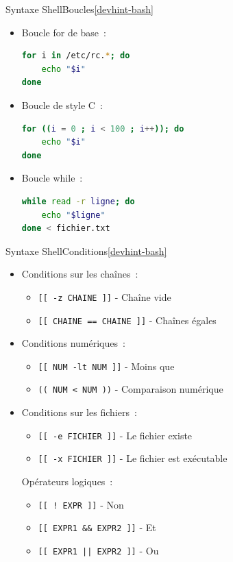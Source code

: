 \documentclass{beamer}
\begin{document}
    \begin{frame}[fragile]{Syntaxe Shell}{Boucles\cref{devhint-bash}}
        \begin{itemize}
            \item Boucle for de base~:
            \begin{lstlisting}[language=bash]
for i in /etc/rc.*; do
    echo "$i"
done
            \end{lstlisting}
            \item Boucle de style C~:
            \begin{lstlisting}[language=bash]
for ((i = 0 ; i < 100 ; i++)); do
    echo "$i"
done
            \end{lstlisting}
            \item Boucle while~:
            \begin{lstlisting}[language=bash]
while read -r ligne; do
    echo "$ligne"
done < fichier.txt
            \end{lstlisting}
        \end{itemize}
    \end{frame}

    \begin{frame}{Syntaxe Shell}{Conditions\cref{devhint-bash}}
        \begin{itemize}
            \item Conditions sur les chaînes~:
            \begin{itemize}
                \item \lstinline{[[ -z CHAINE ]]} - Chaîne vide
                \item \lstinline{[[ CHAINE == CHAINE ]]} - Chaînes égales
            \end{itemize}
            \item Conditions numériques~:
            \begin{itemize}
                \item \lstinline{[[ NUM -lt NUM ]]} - Moins que
                \item \lstinline{(( NUM < NUM ))} - Comparaison numérique
            \end{itemize}
            \item Conditions sur les fichiers~:
            \begin{itemize}
                \item \lstinline{[[ -e FICHIER ]]} - Le fichier existe
                \item \lstinline{[[ -x FICHIER ]]} - Le fichier est exécutable
            \end{itemize}
            Opérateurs logiques~:
            \begin{itemize}
                \item \lstinline{[[ ! EXPR ]]} - Non
                \item \lstinline{[[ EXPR1 && EXPR2 ]]} - Et
                \item \lstinline{[[ EXPR1 || EXPR2 ]]} - Ou
            \end{itemize}
        \end{itemize}
    \end{frame}
\end{document}
